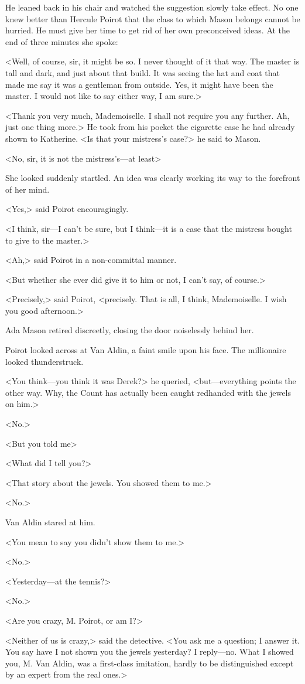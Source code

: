 He leaned back in his chair and watched the suggestion slowly take effect. No one knew better than Hercule Poirot that the class to which Mason belongs cannot be hurried. He must give her time to get rid of her own preconceived ideas. At the end of three minutes she spoke:

<Well, of course, sir, it might be so. I never thought of it that way. The master is tall and dark, and just about that build. It was seeing the hat and coat that made me say it was a gentleman from outside. Yes, it might have been the master. I would not like to say either way, I am sure.>

<Thank you very much, Mademoiselle. I shall not require you any further. Ah, just one thing more.> He took from his pocket the cigarette case he had already shown to Katherine. <Is that your mistress's case?> he said to Mason.

<No, sir, it is not the mistress's—at least\longdash>

She looked suddenly startled. An idea was clearly working its way to the forefront of her mind.

<Yes,> said Poirot encouragingly.

<I think, sir—I can't be sure, but I think—it is a case that the mistress bought to give to the master.>

<Ah,> said Poirot in a non-committal manner.

<But whether she ever did give it to him or not, I can't say, of course.>

<Precisely,> said Poirot, <precisely. That is all, I think, Mademoiselle. I wish you good afternoon.>

Ada Mason retired discreetly, closing the door noiselessly behind her.

Poirot looked across at Van Aldin, a faint smile upon his face. The millionaire looked thunderstruck.

<You think—you think it was Derek?> he queried, <but—everything points the other way. Why, the Count has actually been caught redhanded with the jewels on him.>

<No.>

<But you told me\longdash>

<What did I tell you?>

<That story about the jewels. You showed them to me.>

<No.>

Van Aldin stared at him.

<You mean to say you didn't show them to me.>

<No.>

<Yesterday—at the tennis?>

<No.>

<Are you crazy, M. Poirot, or am I?>

<Neither of us is crazy,> said the detective. <You ask me a question; I answer it. You say have I not shown you the jewels yesterday? I reply—no. What I showed you, M. Van Aldin, was a first-class imitation, hardly to be distinguished except by an expert from the real ones.>
